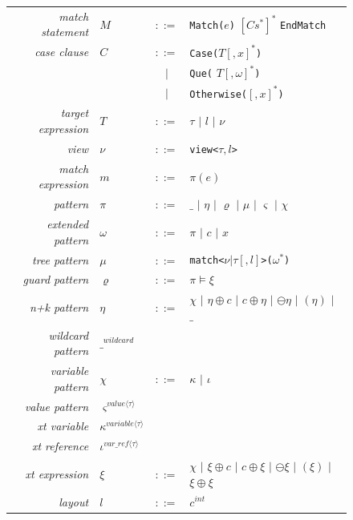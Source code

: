 \documentclass[preprint]{sigplanconf}
\makeatletter
\DeclareRobustCommand{\code}[1]{{\lstinline[breaklines=false,escapechar=@]{#1}}}
\newcommand{\Rule}[1]{{\rmfamily\itshape{#1}}}
\newcommand{\Alt}{\ensuremath{|}}
\newcommand{\is}{$::=$}
\makeatother
\begin{document}
\begin{figure}
\begin{center}
\begin{tabular}{rp{0em}cl}
\Rule{match statement}     & $M$       & \is{}  & \code{Match(}$e$\code{)} $\left[C s^*\right]^*$ \code{EndMatch} \\
\Rule{case clause}         & $C$       & \is{}  & \code{Case(}$T\left[,x\right]^*$\code{)} \\
                           &           & \Alt{} & \code{Que(} $T\left[,\omega\right]^*$\code{)} \\
                           &           & \Alt{} & \code{Otherwise(}$\left[,x\right]^*$\code{)} \\
\Rule{target expression}   & $T$       & \is{}  & $\tau$ \Alt{} $l$ \Alt{} $\nu$ \\
\Rule{view}                & $\nu$     & \is{}  & \code{view<}$\tau,l$\code{>} \\
\Rule{match expression}    & $m$       & \is{}  & $\pi(e)$ \\
\Rule{pattern}             & $\pi$     & \is{}  & $\_$ \Alt{} $\eta$ \Alt{} $\varrho$ \Alt{} $\mu$ \Alt{} $\varsigma$ \Alt{} $\chi$ \\
\Rule{extended pattern}    & $\omega$  & \is{}  & $\pi$ \Alt{} $c$ \Alt{} $x$ \\
\Rule{tree pattern}        & $\mu$     & \is{}  & \code{match<}$\nu|\tau\left[,l\right]$\code{>(}$\omega^*$\code{)} \\
\Rule{guard pattern}       & $\varrho$ & \is{}  & $\pi \models \xi$ \\
\Rule{n+k pattern}         & $\eta$    & \is{}  & $\chi$ \Alt{} $\eta \oplus c$ \Alt{} $c \oplus \eta$ \Alt{} $\ominus \eta$ \Alt{} $(\eta)$ \Alt{} $\_$ \\
\Rule{wildcard pattern}    & $\_^{wildcard}$ \\
\Rule{variable pattern}    & $\chi$    & \is{}  & $\kappa$ \Alt{} $\iota$ \\
\Rule{value pattern}       & $\varsigma^{value\langle\tau\rangle}$ \\
\Rule{xt variable}         & $\kappa^{variable\langle\tau\rangle}$ \\
\Rule{xt reference}        & $\iota^{var\_ref\langle\tau\rangle}$  \\
\Rule{xt expression}       & $\xi$     & \is{}  & $\chi$ \Alt{} $\xi \oplus c$ \Alt{} $c \oplus \xi$ \Alt{} $\ominus \xi$ \Alt{} $(\xi)$ \Alt{} $\xi \oplus \xi$ \\
\Rule{layout}              & $l$       & \is{}  & $c^{int}$ \\

\end{tabular}
\end{center}
\end{figure}
\end{document}
